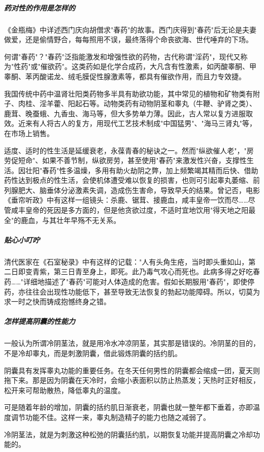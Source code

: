 \subparagraph{药对性的作用是怎样的}

《金瓶梅》中详述西门庆向胡僧求"春药"的故事。西门庆得到"春药"后无论是夫妻做爱，还是偷情野合，每每照用不误，最终落得个命丧欲海、世代唾弃的下场。

何谓"春药"？"春药"泛指能激发和增强性欲的药物，古代称谓"淫药"，现代又称为"性药"或"催欲药"。这类药如是化学合成药，大凡含有性激素，如丙酸睾酮、甲睾酮、苯丙酸诺龙、绒毛膜促性腺激素等，都具有催欲作用，而且力专效捷。

我国传统中药中温肾壮阳类药物多半具有助欲功能，其中常见的植物和矿物类有附子、肉桂、淫羊藿、阳起石等。动物类药有动物阴茎和睾丸（牛鞭、驴肾之类）、鹿茸、晚蚕蛾、九香虫、海马等，但大多势单力薄。因此，古人常以复方进服取效。近来有人将古人的复方，用现代工艺技术制成"中国猛男"、"海马三肾丸"等，在市场上销售。

适度、适时的性生活是延缓衰老，永葆青春的秘诀之一。然而"纵欲催人老"，"房劳促短命"、如果不善节制，纵欲房劳，甚至使用"春药"来激发性兴奋，支撑性生活。因壮阳"春药"性多温燥，多用有助火劫阴之弊，加上频繁竭其精而后快、借助药性达到极点的性生活，会使机体遭受难以恢复的损害，也则可引起睾丸萎缩、前列腺肥大、脑垂体分泌激素失调，造成伤生害命，导致早夭的结果。曾记否，电影《垂帘听政》中有这样一组镜头：杀鹿、锯茸、接鹿血，咸丰皇帝一饮而尽……尽管咸丰皇帝的死因是多方面的，但是他贪欲过度，不适时宜地饮用"得天地之阳最全"的鹿血，与其壮年早殇不无关系。

\subparagraph{贴心小叮咛}

清代医家在《石室秘录》中有这样的记载："人有头角生疮，当时即头重如山，第二日即变青紫，第三日青至身上，即死。此乃毒气攻心而死也。此病多得之好吃春药……"详细地描述了"春药"可能对人体造成的危害。假如长期服用"春药"，即使停药，亦往往会出现性功能低下，甚至导致无法恢复的勃起功能障碍。所以，切莫为求一时之快而铸成抱憾终身之错。

\subparagraph{怎样提高阴囊的性能力}

一般认为所谓冷阴茎法，就是用冷水冲凉阴茎，其实那是错误的。冷阴茎的目的，不是冷却睾丸，而是刺激阴囊，借此锻炼阴囊的括约肌。

阴囊具有发挥睾丸功能的重要任务。在冬天任何男性的阴囊都会缩成一团，夏天则拖下来。那是因为阴囊在天冷时，会缩小表面积以防止热蒸发；天热时正好相反，松开来可帮助散热，降低睾丸的温度。

可是随着年龄的增加，阴囊的括约肌日渐衰老，阴囊也就一整年都下垂着，亦即温度调节功能不佳。这样一来，睾丸制造精子的能力也随之减弱了。

冷阴茎法，就是为刺激这种松弛的阴囊括约肌，以期恢复功能并提高阴囊之冷却功能的。

